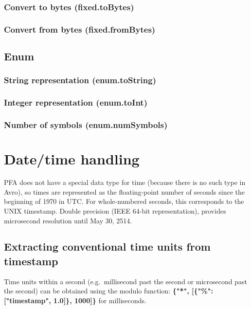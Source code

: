 \documentclass{article}
\newcommand{\PFAc}{\ttfamily\bfseries}
\theoremstyle{definition}
\begin{document}
\subsubsection{Convert to bytes (fixed.toBytes)}

\subsubsection{Convert from bytes (fixed.fromBytes)}

\subsection{Enum}

\subsubsection{String representation (enum.toString)}

\subsubsection{Integer representation (enum.toInt)}

\subsubsection{Number of symbols (enum.numSymbols)}

\pagebreak
\section{Date/time handling}

PFA does not have a special data type for time (because there is no such type in Avro), so times are represented as the floating-point number of seconds since the beginning of 1970 in UTC.  For whole-numbered seconds, this corresponds to the UNIX timestamp.  Double precision (IEEE 64-bit representation), provides microsecond resolution until May 30, 2514.

\subsection{Extracting conventional time units from timestamp}

Time units within a second (e.g.\ millisecond past the second or microsecond past the second) can be obtained using the modulo function: {\PFAc \{"*", [\{"\%":$\!$ ["timestamp",$\!$ 1.0]\}, 1000]\}} for milliseconds.
\end{document}
